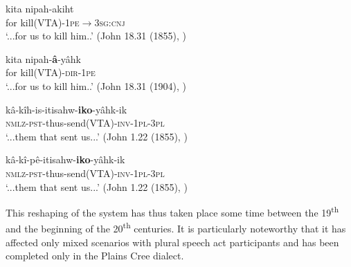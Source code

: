 \documentclass[twoside,a4paper,11pt]{article}
\newcommand{\sg}{\textsc{sg}}
\newcommand{\pl}{\textsc{pl}}
\newcommand{\cnj}{\textsc{cnj}}
\newcommand{\dir}{\textsc{dir}}
\newcommand{\inv}{\textsc{inv}}
\newcommand{\nmlz}{\textsc{nmlz}}
\newcommand{\pe}{\textsc{pe}}
\newcommand{\pst}{\textsc{pst}}
\begin{document}
\begin{exe}
\ex 
\begin{xlist}
\ex \label{ex:oldercreeakiht}
 \gll kita nipah-akiht\\
{for} kill(VTA)-1\pe$\rightarrow$3\sg:\cnj\\
\glt `...for us to kill him..' (John 18.31 (1855),  \citealt[p. 3]{dahlstrom89change})

\ex \label{ex:newcreeakiht}
 \gll kita nipah-\textbf{â}-yâhk\\
{for} kill(VTA)-\dir-1\pe\\
\glt `...for us to kill him..' (John 18.31 (1904),  \citealt[p. 3]{dahlstrom89change})
\end{xlist}
\end{exe}

\begin{exe}
\ex 
\begin{xlist}
\ex \label{ex:oldikoyaahk}
 \gll kâ-kîh-is-itisahw-\textbf{iko}-yâhk-ik\\
\nmlz-\pst-thus-send(VTA)-\inv-1\pl-3\pl\\
\glt `...them that sent us...' (John 1.22 (1855),  \citealt[p. 3]{dahlstrom89change})

\ex \label{ex:newikoyaahk}
 \gll kâ-kî-pê-itisahw-\textbf{iko}-yâhk-ik\\
\nmlz-\pst-thus-send(VTA)-\inv-1\pl-3\pl\\
\glt `...them that sent us...' (John 1.22 (1855),  \citealt[p. 3]{dahlstrom89change})
\end{xlist}
\end{exe}

% 

This reshaping of the system has thus taken place some time between the 19\textsuperscript{th} and the beginning of the 20\textsuperscript{th} centuries. It is particularly noteworthy that it has affected only mixed scenarios with plural speech act participants and has been completed only in the Plains Cree dialect. 
\end{document}
